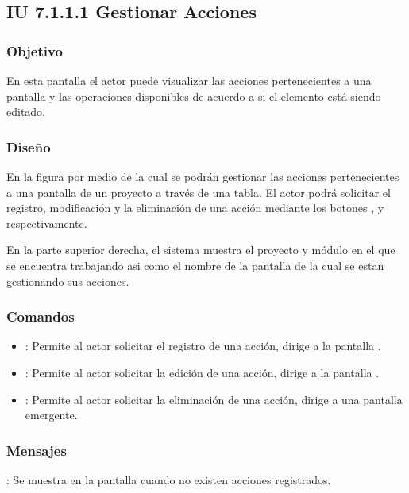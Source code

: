 \subsection{IU 7.1.1.1 Gestionar Acciones}

\subsubsection{Objetivo}
	En esta pantalla el actor puede visualizar las acciones pertenecientes a una pantalla y las operaciones disponibles de acuerdo a si el elemento está siendo editado.
\subsubsection{Diseño}
	En la figura  por medio de la cual se podrán gestionar las acciones pertenecientes a una pantalla de un proyecto a través de una tabla. El actor podrá solicitar el registro, modificación y la eliminación de una acción mediante los botones , \editar y \eliminar respectivamente.
	
	En la parte superior derecha, el sistema muestra el proyecto  y módulo en el que se encuentra trabajando asi como el nombre de la pantalla de la cual se estan gestionando sus acciones.

\subsubsection{Comandos}
\begin{itemize}
	\item {}: Permite al actor solicitar el registro de una acción, dirige a la pantalla .
	\item \editar [Modificar]: Permite al actor solicitar la edición de una acción, dirige a la pantalla .
	\item \eliminar [Eliminar]: Permite al actor solicitar la eliminación de una acción, dirige a una pantalla emergente.
\end{itemize}
\subsubsection{Mensajes}

\begin{Citemize}
	\item {}: Se muestra en la pantalla  cuando no existen acciones registrados.
\end{Citemize}

